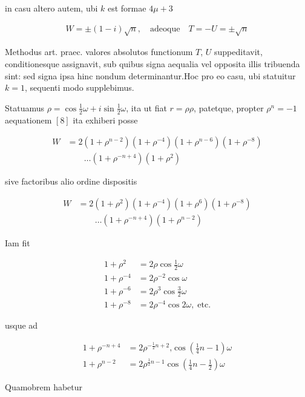 in casu altero autem, ubi $k$ est formae $4\mu+3$

\[
\begin{aligned}
W=\pm(1-i)\surd n,\quad\text{adeoque}\quad T=-U=\pm\surd n
\end{aligned}
\]


Methodus art. praec. valores absolutos functionum $T$, $U$ suppeditavit, conditionesque assignavit, sub quibus signa aequalia vel opposita illis tribuenda sint: sed signa ipsa hinc nondum determinantur.\quad Hoc pro eo casu, ubi statuitur $k=1$, sequenti modo supplebimus.

Statuamus $\rho=\cos\frac12\omega+i\sin\frac12\omega$, ita ut fiat $r=\rho\rho$, patetque, propter $\rho^n=-1$ aequationem $[8]$ ita exhiberi posse

\[
\begin{aligned}
W&=2(1+\rho^{n-2})(1+\rho^{-4})(1+\rho^{n-6})(1+\rho^{-8})\\&\qquad\ldots(1+\rho^{-n+4})(1+\rho^2)
\end{aligned}
\]

sive factoribus alio ordine dispositis

\[
\begin{aligned}
W&=2(1+\rho^2)(1+\rho^{-4})(1+\rho^6)(1+\rho^{-8})\\&\qquad\ldots(1+\rho^{-n+4})(1+\rho^{n-2})
\end{aligned}
\]

Iam fit

\[
\begin{aligned}
1+\rho^2&=2\rho\cos\frac12\omega\\
1+\rho^{-4}&=2\rho^{-2}\cos\omega\\
1+\rho^{-6}&=2\rho^3\cos\frac32\omega\\
1+\rho^{-8}&=2\rho^{-4}\cos2\omega,\;\text{etc.}
\end{aligned}
\]

usque ad

\[
\begin{aligned}
1+\rho^{-n+4}&=2\rho^{-\frac12n+2}\mathord{,}\cos(\frac14n-1)\omega\\
1+\rho^{n-2}&=2\rho^{\frac12n-1}\cos(\frac14n-\frac12)\omega
\end{aligned}
\]

Quamobrem habetur

